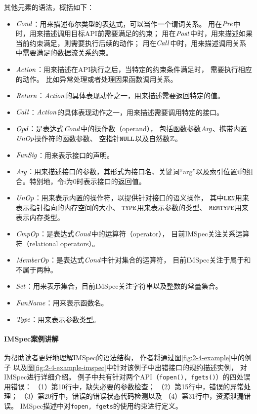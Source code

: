 

其他元素的语法，概括如下：
\begin{itemize}
	\item $\mathit{Cond}$：用来描述布尔类型的表达式，可以当作一个谓词关系。
	用在$\mathit{Pre}$中时，用来描述调用目标API前需要满足的约束；
	用在$\mathit{Post}$中时，用来描述如果当前约束满足，则需要执行后续的动作；
	用在$\mathit{Call}$中时，用来描述调用关系中需要满足的数据流关系约束。
	\item $\mathit{Action}$：用来描述在API执行之后，当特定的约束条件满足时，
	需要执行相应的动作。
	比如异常处理或者处理因果函数调用关系。
	\item $\mathit{Return}$：$\mathit{Action}$的具体表现动作之一，用来描述需要返回特定的值。
	\item $\mathit{Call}$：$\mathit{Action}$的具体表现动作之一，用来描述需要调用特定的接口。
	\item $\mathit{Opd}$：是表达式$\mathit{Cond}$中的操作数（operand），
	包括函数参数$\mathit{Arg}$、携带内置$\mathit{UnOp}$操作符的函数参数、
	空指针$\texttt{\textbf{NULL}}$以及自然数$\mathbb{Z}$。
	\item $\mathit{FunSig}$：用来表示接口的声明。
	\item $\mathit{Arg}$：用来描述接口的参数，其形式为接口名、关键词“arg”以及索引位置i的组合。特别地，令i为0时表示接口的返回值。
	\item $\mathit{UnOp}$：用来表示内置的操作符，以提供针对接口的语义操作，
	其中\textbf{$\texttt{LEN}$}用来表示指针指向的内存空间的大小、
	\textbf{$\texttt{TYPE}$}用来表示参数的类型、
	\textbf{$\texttt{MEMTYPE}$}用来表示内存类型。
	\item $\mathit{CmpOp}$：是表达式$\mathit{Cond}$中的运算符（operator），
	目前IMSpec关注关系运算符（relational operators）。
	\item $\mathit{MemberOp}$：是表达式$\mathit{Cond}$中针对集合的运算符，
	目前IMSpec关注于属于和不属于两种。
	\item $\mathit{Set}$：用来表示集合，目前IMSpec关注字符串以及整数的常量集合。
	\item $\mathit{FunName}$：用来表示函数名。
	\item $\mathit{Type}$：用来表示参数类型。
\end{itemize}



\paragraph{IMSpec案例讲解}
为帮助读者更好地理解IMSpec的语法结构，
作者将通过图\ref{fig:2-4-example}中的例子
以及图\ref{fig:2-4-example-imspec}中针对该例子中出错接口的规约描述实例，
对IMSpec进行详细介绍。
例子中共有针对两个API（\texttt{fopen(), fgets()}）的四处误用错误：
（1）第10行中，缺失必要的参数检查；
（2）第15行中，错误的异常处理；
（3）第20行中，错误的错误状态代码检测以及
（4）第31行中，资源泄漏错误。
IMSpec描述中对\texttt{fopen, fgets}的使用约束进行定义。

